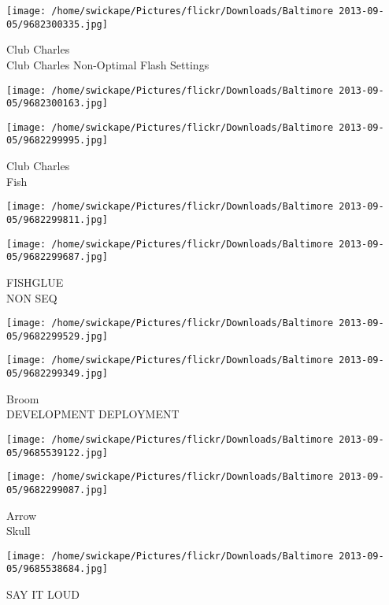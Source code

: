 \documentclass[10pt,letterpaper]{article}
\begin{document}
\vspace{0.25in}
\texttt{[image: /home/swickape/Pictures/flickr/Downloads/Baltimore 2013-09-05/9682300335.jpg]}

Club Charles\\
Club Charles Non{-}Optimal Flash Settings
\pagebreak

\texttt{[image: /home/swickape/Pictures/flickr/Downloads/Baltimore 2013-09-05/9682300163.jpg]}

\vspace{0.25in}
\texttt{[image: /home/swickape/Pictures/flickr/Downloads/Baltimore 2013-09-05/9682299995.jpg]}

Club Charles\\
Fish
\pagebreak

\texttt{[image: /home/swickape/Pictures/flickr/Downloads/Baltimore 2013-09-05/9682299811.jpg]}

\vspace{0.25in}
\texttt{[image: /home/swickape/Pictures/flickr/Downloads/Baltimore 2013-09-05/9682299687.jpg]}

FISHGLUE\\
NON SEQ
\pagebreak

\texttt{[image: /home/swickape/Pictures/flickr/Downloads/Baltimore 2013-09-05/9682299529.jpg]}

\vspace{0.25in}
\texttt{[image: /home/swickape/Pictures/flickr/Downloads/Baltimore 2013-09-05/9682299349.jpg]}

Broom\\
DEVELOPMENT DEPLOYMENT
\pagebreak

\texttt{[image: /home/swickape/Pictures/flickr/Downloads/Baltimore 2013-09-05/9685539122.jpg]}

\vspace{0.25in}
\texttt{[image: /home/swickape/Pictures/flickr/Downloads/Baltimore 2013-09-05/9682299087.jpg]}

Arrow\\
Skull
\pagebreak

\texttt{[image: /home/swickape/Pictures/flickr/Downloads/Baltimore 2013-09-05/9685538684.jpg]}

SAY IT LOUD
\pagebreak
\end{document}
